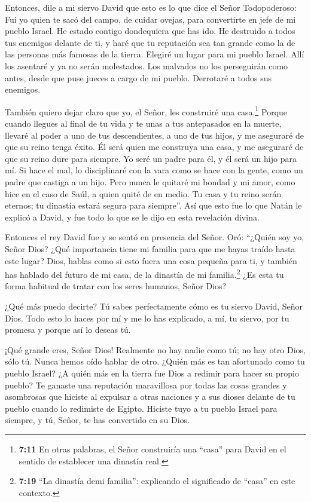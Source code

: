  Entonces, dile a mi siervo David que esto es lo que dice el
Señor Todopoderoso: Fui yo quien te sacó del campo, de cuidar ovejas,
para convertirte en jefe de mi pueblo Israel.  He estado
contigo dondequiera que has ido. He destruido a todos tus enemigos
delante de ti, y haré que tu reputación sea tan grande como la de las
personas más famosas de la tierra.  Elegiré un lugar para
mi pueblo Israel. Allí los asentaré y ya no serán molestados. Los
malvados no los perseguirán como antes,  desde que puse
jueces a cargo de mi pueblo. Derrotaré a todos sus enemigos.

También quiero dejar claro que yo, el Señor, les construiré una
casa.\footnote{\textbf{7:11} En otras palabras, el Señor construiría una
  ``casa'' para David en el sentido de establecer una dinastía real.}
 Porque cuando llegues al final de tu vida y te unas a tus
antepasados en la muerte, llevaré al poder a uno de tus descendientes, a
uno de tus hijos, y me aseguraré de que su reino tenga éxito.
 Él será quien me construya una casa, y me aseguraré de que
su reino dure para siempre.  Yo seré un padre para él, y él
será un hijo para mí. Si hace el mal, lo disciplinaré con la vara como
se hace con la gente, como un padre que castiga a un hijo. 
Pero nunca le quitaré mi bondad y mi amor, como hice en el caso de Saúl,
a quien quité de en medio.  Tu casa y tu reino serán
eternos; tu dinastía estará segura para siempre''.  Así que
esto fue lo que Natán le explicó a David, y fue todo lo que se le dijo
en esta revelación divina.

 Entonces el rey David fue y se sentó en presencia del
Señor. Oró: ``¿Quién soy yo, Señor Dios? ¿Qué importancia tiene mi
familia para que me hayas traído hasta este lugar?  Dios,
hablas como si esto fuera una cosa pequeña para ti, y también has
hablado del futuro de mi casa, de la dinastía de mi familia.\footnote{\textbf{7:19}
  ``La dinastía demi familia'': explicando el significado de ``casa'' en
  este contexto.} ¿Es esta tu forma habitual de tratar con los seres
humanos, Señor Dios?

 ¿Qué más puedo decirte? Tú sabes perfectamente cómo es tu
siervo David, Señor Dios.  Todo esto lo haces por mí y me
lo has explicado, a mí, tu siervo, por tu promesa y porque así lo deseas
tú.

 ¡Qué grande eres, Señor Dios! Realmente no hay nadie como
tú; no hay otro Dios, sólo tú. Nunca hemos oído hablar de otro.
 ¿Quién más es tan afortunado como tu pueblo Israel? ¿A
quién más en la tierra fue Dios a redimir para hacer su propio pueblo?
Te ganaste una reputación maravillosa por todas las cosas grandes y
asombrosas que hiciste al expulsar a otras naciones y a sus dioses
delante de tu pueblo cuando lo redimiste de Egipto. 
Hiciste tuyo a tu pueblo Israel para siempre, y tú, Señor, te has
convertido en su Dios.

